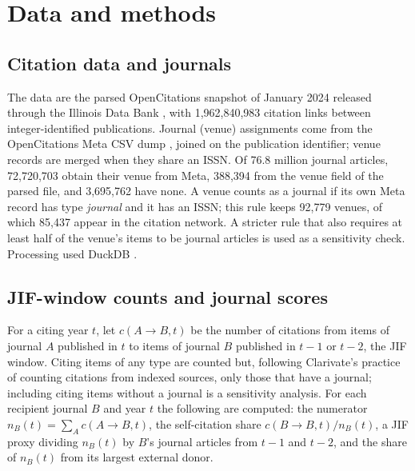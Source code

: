 \section{Data and methods}\label{sec:methods}

\subsection{Citation data and journals}
The data are the parsed OpenCitations snapshot of January 2024 released through the Illinois Data Bank
\citep{arjomandi2024dataset}, with 1,962,840,983 citation links between integer-identified publications. Journal
(venue) assignments come from the OpenCitations Meta CSV dump \citep{ocmeta2024dump,massari2024meta}, joined on the
publication identifier; venue records are merged when they share an ISSN. Of 76.8 million journal articles,
72,720,703 obtain their venue from Meta, 388,394 from the venue field of the parsed file, and 3,695,762 have none. A
venue counts as a journal if its own Meta record has type \emph{journal} and it has an ISSN; this rule keeps 92,779
venues, of which 85,437 appear in the citation network. A stricter rule that also requires at least half of the
venue's items to be journal articles is used as a sensitivity check. Processing used DuckDB \citep{raasveldt2019duckdb}.

\subsection{JIF-window counts and journal scores}
For a citing year $t$, let $c(A\!\to\!B,t)$ be the number of citations from items of journal $A$ published in $t$ to
items of journal $B$ published in $t-1$ or $t-2$, the JIF window. Citing items of any type are counted but, following
Clarivate's practice of counting citations from indexed sources, only those that have a journal; including
citing items without a journal is a sensitivity analysis. For each recipient journal $B$ and year $t$ the following are computed: the numerator $n_B(t)=\sum_A c(A\!\to\!B,t)$, the self-citation share $c(B\!\to\!B,t)/n_B(t)$, a JIF proxy dividing $n_B(t)$
by $B$'s journal articles from $t-1$ and $t-2$, and the share of $n_B(t)$ from its largest external donor.

